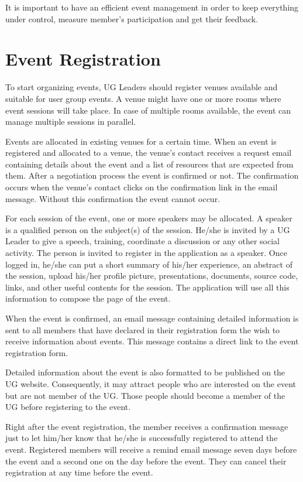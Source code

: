 \documentclass[envcountsame,envcountchap,letterpaper]{svmono}
\begin{document}
It is important to have an efficient event management in order to keep everything under control, measure member's participation and get their feedback.

\section{Event Registration}

To start organizing events, UG Leaders should register venues available and suitable for user group events. A venue might have one or more rooms where event sessions will take place. In case of multiple rooms available, the event can manage multiple sessions in parallel.

Events are allocated in existing venues for a certain time. When an event is registered and allocated to a venue, the venue's contact receives a request email containing details about the event and a list of resources that are expected from them. After a negotiation process the event is confirmed or not. The confirmation occurs when the venue's contact clicks on the confirmation link in the email message. Without this confirmation the event cannot occur.

For each session of the event, one or more speakers may be allocated. A speaker is a qualified person on the subject(s) of the session. He/she is invited by a UG Leader to give a speech, training, coordinate a discussion or any other social activity. The person is invited to register in the application as a speaker.  Once logged in, he/she can put a short summary of his/her experience, an abstract of the session, upload his/her profile picture, presentations, documents, source code, links, and other useful contents for the session. The application will use all this information to compose the page of the event.

When the event is confirmed, an email message containing detailed information is sent to all members that have declared in their registration form the wish to receive information about events. This message contains a direct link to the event registration form.

Detailed information about the event is also formatted to be published on the UG website. Consequently, it may attract people who are interested on the event but are not member of the UG. Those people should become a member of the UG before registering to the event.

Right after the event registration, the member receives a confirmation message just to let him/her know that he/she is successfully registered to attend the event. Registered members will receive a remind email message seven days before the event and a second one on the day before the event. They can cancel their registration at any time before the event.
\end{document}
